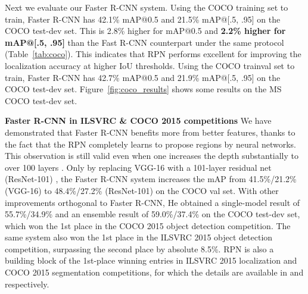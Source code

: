 \documentclass[10pt,journal,cspaper,compsoc]{IEEEtran}
\begin{document}
Next we evaluate our Faster R-CNN system.
Using the COCO training set to train, Faster R-CNN has 42.1\% mAP@0.5 and 21.5\% mAP@[.5, .95] on the COCO test-dev set. This is 2.8\% higher for mAP@0.5 and \textbf{2.2\% higher for mAP@[.5, .95]} than the Fast R-CNN counterpart under the same protocol (Table~\ref{tab:coco}). This indicates that RPN performs excellent for improving the localization accuracy at higher IoU thresholds.
Using the COCO trainval set to train, Faster R-CNN has 42.7\% mAP@0.5 and 21.9\% mAP@[.5, .95] on the COCO test-dev set.
Figure~\ref{fig:coco_results} shows some results on the MS COCO test-dev set.

\vspace{.5em}
\noindent\textbf{Faster R-CNN in ILSVRC \& COCO 2015 competitions}
We have demonstrated that Faster R-CNN benefits more from better features, thanks to the fact that the RPN completely learns to propose regions by neural networks. This observation is still valid even when one increases the depth substantially to over 100 layers \cite{He2015a}. Only by replacing VGG-16 with a 101-layer residual net (ResNet-101) \cite{He2015a}, the Faster R-CNN system increases the mAP from 41.5\%/21.2\% (VGG-16) to 48.4\%/27.2\% (ResNet-101) on the COCO val set. With other improvements orthogonal to Faster R-CNN, He \etal \cite{He2015a} obtained a single-model result of 55.7\%/34.9\% and an ensemble result of 59.0\%/37.4\% on the COCO test-dev set, which won the 1st place in the COCO 2015 object detection competition. The same system \cite{He2015a} also won the 1st place in the ILSVRC 2015 object detection competition, surpassing the second place by absolute 8.5\%. RPN is also a building block of the 1st-place winning entries in ILSVRC 2015 localization and COCO 2015 segmentation competitions, for which the details are available in \cite{He2015a} and \cite{Dai2015a} respectively.
\end{document}
